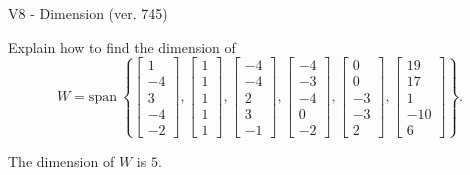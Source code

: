 \begin{exercise}
  \begin{exerciseTitle}V8 - Dimension (ver. 745)\end{exerciseTitle}
  \begin{exerciseStatement}
    Explain how to find the dimension of 
\[W=\mathrm{span}\ \left\{\left[\begin{array}{r}
1 \\
-4 \\
3 \\
-4 \\
-2
\end{array}\right] , \left[\begin{array}{r}
1 \\
1 \\
1 \\
1 \\
1
\end{array}\right] , \left[\begin{array}{r}
-4 \\
-4 \\
2 \\
3 \\
-1
\end{array}\right] , \left[\begin{array}{r}
-4 \\
-3 \\
-4 \\
0 \\
-2
\end{array}\right] , \left[\begin{array}{r}
0 \\
0 \\
-3 \\
-3 \\
2
\end{array}\right] , \left[\begin{array}{r}
19 \\
17 \\
1 \\
-10 \\
6
\end{array}\right]\right\}.\]



  \end{exerciseStatement}
  \begin{exerciseAnswer}
   The dimension of \(W\) is  \(5\).
  


  \end{exerciseAnswer}
\end{exercise}